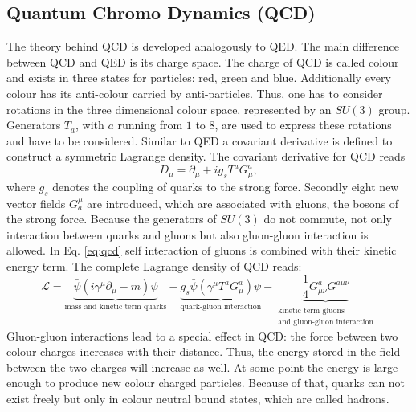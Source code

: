 	\subsection{Quantum Chromo Dynamics (QCD)}
	The theory behind QCD is developed analogously to QED. The main difference between QCD and QED is its charge space. The charge of QCD is called colour and exists in three states for particles: red, green and blue. Additionally every colour has its anti-colour carried by anti-particles. Thus, one has to consider rotations in the three dimensional colour space, represented by an $SU(3)$ group. Generators $T_a$, with $a$ running from $1$ to $8$, are used to express these rotations and have to be considered. Similar to QED a covariant derivative is defined to construct a symmetric Lagrange density. The covariant derivative for QCD reads
	\begin{equation}
	D_\mu = \partial_\mu + i g_s T^a G^a_{\mu},
	\end{equation}
	where $g_s$ denotes the coupling of quarks to the strong force. Secondly eight new vector fields $G_a^\mu$ are introduced, which are associated with gluons, the bosons of the strong force. Because the generators of $SU(3)$ do not commute, not only interaction between quarks and gluons but also gluon-gluon interaction is allowed. In Eq. \ref{eq:qcd} self interaction of gluons is combined with their kinetic energy term. The complete Lagrange density of QCD reads:
	\begin{equation}
	\mathcal{L} = \underbrace{\bar{\psi}(i \gamma^\mu \partial_\mu -m ) \psi}_{\text{mass and kinetic term quarks}} - \underbrace{g_s \bar{\psi}(\gamma^\mu T^a G^a_\mu) \psi}_{\text{quark-gluon interaction}} - \underbrace{\frac{1}{4} G^a_{\mu \nu}G^{a \mu \nu}}_{\substack{\text{kinetic term gluons} \\ \text{and gluon-gluon interaction}}}
	\label{eq:qcd}
	\end{equation}
	Gluon-gluon interactions lead to a special effect in QCD: the force between two colour charges increases with their distance. Thus, the energy stored in the field between the two charges will increase as well. At some point the energy is large enough to produce new colour charged particles. Because of that, quarks can not exist freely but only in colour neutral bound states, which are called hadrons.

